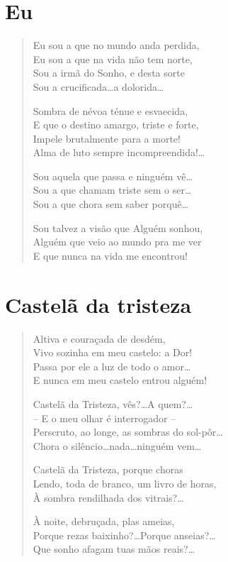\chapter{Eu}

\begin{verse}
Eu sou a que no mundo anda perdida,\\
Eu sou a que na vida não tem norte,\\
Sou a irmã do Sonho, e desta sorte\\
Sou a crucificada\ldots a dolorida\ldots  

Sombra de névoa ténue e esvaecida,\\
E que o destino amargo, triste e forte,\\
Impele brutalmente para a morte!\\
Alma de luto sempre incompreendida!\ldots  

Sou aquela que passa e ninguém vê\ldots\\
Sou a que chamam triste sem o ser\ldots\\
Sou a que chora sem saber porquê\ldots  

Sou talvez a visão que Alguém sonhou,\\
Alguém que veio ao mundo pra me ver\\
E que nunca na vida me encontrou! 
\end{verse}

\chapter{Castelã da tristeza}

\begin{verse}
Altiva e couraçada de desdém,\\
Vivo sozinha em meu castelo: a Dor!\\
Passa por ele a luz de todo o amor\ldots\\
E nunca em meu castelo entrou alguém!

Castelã da Tristeza, vês?\ldots A quem?\ldots\\
– E o meu olhar é interrogador –\\
Perscruto, ao longe, as sombras do sol-pôr\ldots\\
Chora o silêncio\ldots  nada\ldots  ninguém vem\ldots

Castelã da Tristeza, porque choras\\
Lendo, toda de branco, um livro de horas,\\
À sombra rendilhada dos vitrais?\ldots

À noite, debruçada, plas ameias,\\
Porque rezas baixinho?\ldots Porque anseias?\ldots\\
Que sonho afagam tuas mãos reais?\ldots
\end{verse}

